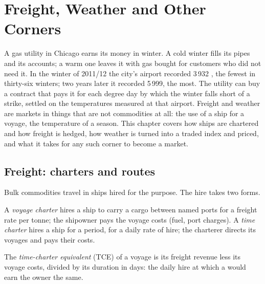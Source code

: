\chapter{Freight, Weather and Other Corners}\label{ch:m3:freight-weather-and-other-corners}

A gas utility in Chicago earns its money in winter. A cold winter fills its pipes and its
accounts; a warm one leaves it with gas bought for customers who did not need it. In the
winter of 2011/12 the city's airport recorded 3\,932 , the fewest in
thirty-six winters; two years later it recorded 5\,999, the most. The utility can buy a
contract that pays it for each degree day by which the winter falls short of a strike,
settled on the temperatures measured at that airport. Freight and weather are markets in
things that are not commodities at all: the use of a ship for a voyage, the temperature of
a season. This chapter covers how ships are chartered and how freight is hedged, how
weather is turned into a traded index and priced, and what it takes for any such corner to
become a market.

\section{Freight: charters and routes}

Bulk commodities travel in ships hired for the purpose. The hire takes two forms.

\begin{definition}\label{def:m3:freight-weather-and-other-corners:charter}
A \emph{voyage charter} hires a ship to carry a cargo between named ports
for a freight rate per tonne; the shipowner pays the voyage costs (fuel, port charges). A
\emph{time charter} hires a ship for a period, for a daily rate of hire; the
charterer directs its voyages and pays their costs.
\end{definition}

\begin{definition}\label{def:m3:freight-weather-and-other-corners:tce}
The \emph{time-charter equivalent} (TCE) of a voyage is its freight
revenue less its voyage costs, divided by its duration in days: the daily hire at which a  would earn the owner the same.
\end{definition}

